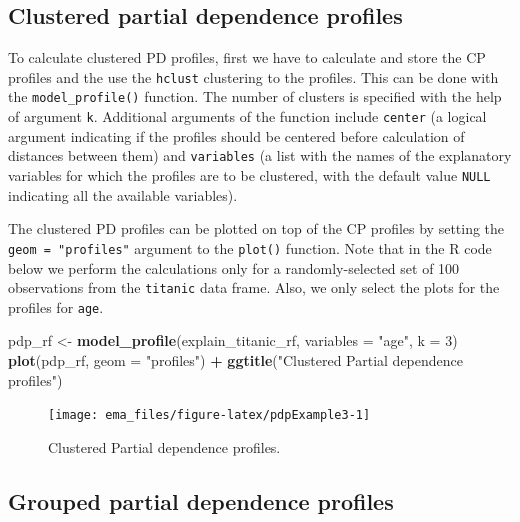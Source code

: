 \documentclass[]{krantz}
\newenvironment{Shaded}{\begin{snugshade}}{\end{snugshade}}
\newcommand{\DataTypeTok}[1]{\textcolor[rgb]{0.13,0.29,0.53}{#1}}
\newcommand{\DecValTok}[1]{\textcolor[rgb]{0.00,0.00,0.81}{#1}}
\newcommand{\KeywordTok}[1]{\textcolor[rgb]{0.13,0.29,0.53}{\textbf{#1}}}
\newcommand{\NormalTok}[1]{#1}
\newcommand{\OperatorTok}[1]{\textcolor[rgb]{0.81,0.36,0.00}{\textbf{#1}}}
\newcommand{\StringTok}[1]{\textcolor[rgb]{0.31,0.60,0.02}{#1}}
\begin{document}
\hypertarget{clustered-partial-dependence-profiles-1}{%
\subsection{Clustered partial dependence profiles}\label{clustered-partial-dependence-profiles-1}}

To calculate clustered PD profiles, first we have to calculate and store the CP profiles and the use the \texttt{hclust} clustering to the profiles.
This can be done with the \texttt{model\_profile()} function. The number of clusters is specified with the help of argument \texttt{k}. Additional arguments of the function include \texttt{center} (a logical argument indicating if the profiles should be centered before calculation of distances between them) and \texttt{variables} (a list with the names of the explanatory variables for which the profiles are to be clustered, with the default value \texttt{NULL} indicating all the available variables).

The clustered PD profiles can be plotted on top of the CP profiles by setting the \texttt{geom\ =\ "profiles"} argument to the \texttt{plot()} function. Note that in the R code below we perform the calculations only for a randomly-selected set of 100 observations from the \texttt{titanic} data frame. Also, we only select the plots for the profiles for \texttt{age}.

\begin{Shaded}
\begin{Highlighting}[]
\NormalTok{pdp_rf <-}\StringTok{ }\KeywordTok{model_profile}\NormalTok{(explain_titanic_rf, }\DataTypeTok{variables =} \StringTok{"age"}\NormalTok{, }\DataTypeTok{k =} \DecValTok{3}\NormalTok{)}
\KeywordTok{plot}\NormalTok{(pdp_rf, }\DataTypeTok{geom =} \StringTok{"profiles"}\NormalTok{) }\OperatorTok{+}
\StringTok{  }\KeywordTok{ggtitle}\NormalTok{(}\StringTok{"Clustered Partial dependence profiles"}\NormalTok{) }
\end{Highlighting}
\end{Shaded}

\begin{figure}

{\centering \texttt{[image: ema\_files/figure-latex/pdpExample3-1]} 

}

\caption{Clustered Partial dependence profiles.}\label{fig:pdpExample3}
\end{figure}

\hypertarget{grouped-partial-dependence-profiles-1}{%
\subsection{Grouped partial dependence profiles}\label{grouped-partial-dependence-profiles-1}}
\end{document}
